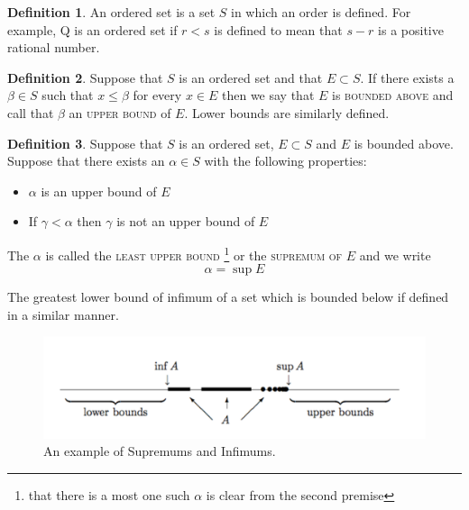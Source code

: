 \documentclass{tufte-book}
\theoremstyle{definition}
\newtheorem{definition}{Definition}[chapter]
\numberwithin{section}{chapter}
\begin{document}
\begin{definition}An {ordered set} is a set $S$ in which an order is defined.  For example, Q is an ordered set if $r<s$ is defined to mean that $s-r$ is a positive rational number. \end{definition}



\begin{definition}Suppose that $S$ is an ordered set and that $E \subset S$.  If there exists a $\beta \in S$ such that $x \leq \beta$ for every $x \in E$ then we say that $E$ is \textsc{bounded above} and call that $\beta$ an \textsc{upper bound} of $E$.  Lower bounds are similarly defined. \end{definition}


\begin{definition} Suppose that $S$ 
is an ordered set, $E \subset S$ and $E$ is bounded above.    Suppose that there exists an $\alpha \in S$ with the following properties:
\begin{itemize}
	\item $\alpha$ is an upper bound of $E$
	\item If $\gamma< \alpha$ then $\gamma$ is not an upper bound of $E$
\end{itemize}
The $\alpha$ is called the \textsc{least upper bound} \footnote{that there is a most one such $\alpha$ is clear from the second premise} or the \textsc{supremum of $E$} and we write
\[\alpha = \sup E\]
\end{definition}

The greatest lower bound of infimum of a set which is bounded below if defined in a similar manner.




\begin{figure}
  \includegraphics{SupInf.pdf}
  \caption{An example of Supremums and Infimums.}
\end{figure}
\end{document}
